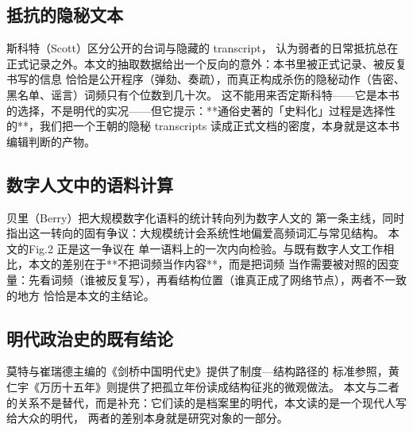 \subsection{抵抗的隐秘文本}斯科特（Scott）\cite{scott1990}区分公开的台词与隐藏的 transcript，
认为弱者的日常抵抗总在正式记录之外。本文的抽取数据给出一个反向的意外：本书里被正式记录、被反复书写的信息
恰恰是公开程序（弹劾、奏疏），而真正构成杀伤的隐秘动作（告密、黑名单、谣言）词频只有个位数到几十次。
这不能用来否定斯科特——它是本书的选择，不是明代的实况——但它提示：**通俗史著的「史料化」过程是选择性
的**，我们把一个王朝的隐秘 transcripts 读成正式文档的密度，本身就是这本书编辑判断的产物。

\subsection{数字人文中的语料计算}贝里（Berry）\cite{berry2011}把大规模数字化语料的统计转向列为数字人文的
第一条主线，同时指出这一转向的固有争议：大规模统计会系统性地偏爱高频词汇与常见结构。
本文的Fig.2 正是这一争议在
单一语料上的一次内向检验。与既有数字人文工作相比，本文的差别在于**不把词频当作内容**，而是把词频
当作需要被对照的因变量：先看词频（谁被反复写），再看结构位置（谁真正成了网络节点），两者不一致的地方
恰恰是本文的主结论。

\subsection{明代政治史的既有结论}莫特与崔瑞德主编的《剑桥中国明代史》\cite{mote1988}提供了制度—结构路径的
标准参照，黄仁宇《万历十五年》\cite{huang1981}则提供了把孤立年份读成结构征兆的微观做法。
本文与二者的关系不是替代，而是补充：它们读的是档案里的明代，本文读的是一个现代人写给大众的明代，
两者的差别本身就是研究对象的一部分。
